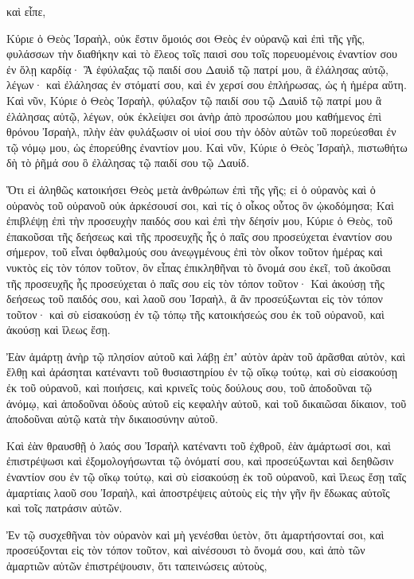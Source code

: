 {καὶ εἶπε,
\par }{\PP Κύριε ὁ Θεὸς Ἰσραὴλ, οὐκ ἔστιν ὅμοιός σοι Θεὸς ἐν οὐρανῷ καὶ ἐπὶ τῆς γῆς, φυλάσσων τὴν διαθήκην καὶ τὸ ἔλεος τοῖς παισὶ σου τοῖς πορευομένοις ἐναντίον σου ἐν ὅλῃ καρδίᾳ·
Ἃ ἐφύλαξας τῷ παιδί σου Δαυὶδ τῷ πατρί μου, ἃ ἐλάλησας αὐτῷ, λέγων· καὶ ἐλάλησας ἐν στόματί σου, καὶ ἐν χερσί σου ἐπλήρωσας, ὡς ἡ ἡμέρα αὕτη.
Καὶ νῦν, Κύριε ὁ Θεὸς Ἰσραὴλ, φύλαξον τῷ παιδί σου τῷ Δαυὶδ τῷ πατρί μου ἃ ἐλάλησας αὐτῷ, λέγων, οὐκ ἐκλείψει σοι ἀνὴρ ἀπὸ προσώπου μου καθήμενος ἐπὶ θρόνου Ἰσραὴλ, πλὴν ἐὰν φυλάξωσιν οἱ υἱοί σου τὴν ὁδὸν αὐτῶν τοῦ πορεύεσθαι ἐν τῷ νόμῳ μου, ὡς ἐπορεύθης ἐναντίον μου.
Καὶ νῦν, Κύριε ὁ Θεὸς Ἰσραὴλ, πιστωθήτω δὴ τὸ ῥῆμά σου ὃ ἐλάλησας τῷ παιδί σου τῷ Δαυίδ.
\par }{\PP {}Ὅτι εἰ ἀληθῶς κατοικήσει Θεὸς μετὰ ἀνθρώπων ἐπὶ τῆς γῆς; εἰ ὁ οὐρανὸς καὶ ὁ οὐρανὸς τοῦ οὐρανοῦ οὐκ ἀρκέσουσί σοι, καὶ τίς ὁ οἶκος οὗτος ὃν ᾠκοδόμησα;
Καὶ ἐπιβλέψῃ ἐπὶ τὴν προσευχὴν παιδός σου καὶ ἐπὶ τὴν δέησίν μου, Κύριε ὁ Θεὸς, τοῦ ἐπακοῦσαι τῆς δεήσεως καὶ τῆς προσευχῆς ἧς ὁ παῖς σου προσεύχεται ἐναντίον σου σήμερον,
τοῦ εἶναι ὀφθαλμούς σου ἀνεῳγμένους ἐπὶ τὸν οἶκον τοῦτον ἡμέρας καὶ νυκτὸς εἰς τὸν τόπον τοῦτον, ὃν εἶπας ἐπικληθῆναι τὸ ὄνομά σου ἐκεῖ, τοῦ ἀκοῦσαι τῆς προσευχῆς ἧς προσεύχεται ὁ παῖς σου εἰς τὸν τόπον τοῦτον·
Καὶ ἀκούσῃ τῆς δεήσεως τοῦ παιδός σου, καὶ λαοῦ σου Ἰσραὴλ, ἃ ἂν προσεύξωνται εἰς τὸν τόπον τοῦτον· καὶ σὺ εἰσακούσῃ ἐν τῷ τόπῳ τῆς κατοικήσεώς σου ἐκ τοῦ οὐρανοῦ, καὶ ἀκούσῃ καὶ ἵλεως ἔσῃ.
\par }{\PP {}Ἐὰν ἁμάρτῃ ἀνὴρ τῷ πλησίον αὐτοῦ καὶ λάβῃ ἐπʼ αὐτὸν ἀρὰν τοῦ ἀρᾶσθαι αὐτὸν, καὶ ἔλθῃ καὶ ἀράσηται κατέναντι τοῦ θυσιαστηρίου ἐν τῷ οἴκῳ τούτῳ,
καὶ σὺ εἰσακούσῃ ἐκ τοῦ οὐρανοῦ, καὶ ποιήσεις, καὶ κρινεῖς τοὺς δούλους σου, τοῦ ἀποδοῦναι τῷ ἀνόμῳ, καὶ ἀποδοῦναι ὁδοὺς αὐτοῦ εἰς κεφαλὴν αὐτοῦ, καὶ τοῦ δικαιῶσαι δίκαιον, τοῦ ἀποδοῦναι αὐτῷ κατὰ τὴν δικαιοσύνην αὐτοῦ.
\par }{\PP {}Καὶ ἐὰν θραυσθῇ ὁ λαός σου Ἰσραὴλ κατέναντι τοῦ ἐχθροῦ, ἐὰν ἁμάρτωσί σοι, καὶ ἐπιστρέψωσι καὶ ἐξομολογήσωνται τῷ ὀνόματί σου, καὶ προσεύξωνται καὶ δεηθῶσιν ἐναντίον σου ἐν τῷ οἴκῳ τούτῳ,
καὶ σὺ εἰσακούσῃ ἐκ τοῦ οὐρανοῦ, καὶ ἵλεως ἔσῃ ταῖς ἁμαρτίαις λαοῦ σου Ἰσραὴλ, καὶ ἀποστρέψεις αὐτοὺς εἰς τὴν γῆν ἣν ἔδωκας αὐτοῖς καὶ τοῖς πατράσιν αὐτῶν.
\par }{\PP {}Ἐν τῷ συσχεθῆναι τὸν οὐρανὸν καὶ μὴ γενέσθαι ὑετὸν, ὅτι ἁμαρτήσονταί σοι, καὶ προσεύξονται εἰς τὸν τόπον τοῦτον, καὶ αἰνέσουσι τὸ ὄνομά σου, καὶ ἀπὸ τῶν ἁμαρτιῶν αὐτῶν ἐπιστρέψουσιν, ὅτι ταπεινώσεις αὐτοὺς,
}
